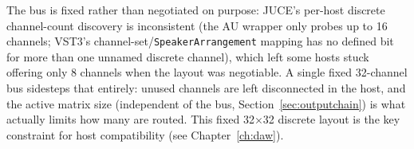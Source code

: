 The bus is fixed rather than negotiated on purpose: JUCE's per-host discrete channel-count discovery is inconsistent (the AU wrapper only probes up to 16 channels; VST3's channel-set/\texttt{SpeakerArrangement} mapping has no defined bit for more than one unnamed discrete channel), which left some hosts stuck offering only 8 channels when the layout was negotiable. A single fixed 32-channel bus sidesteps that entirely: unused channels are left disconnected in the host, and the active matrix size (independent
of the bus, Section~\ref{sec:outputchain}) is what actually limits how many are routed. This fixed 32$\times$32 discrete layout is the key constraint for host compatibility (see Chapter~\ref{ch:daw}).

